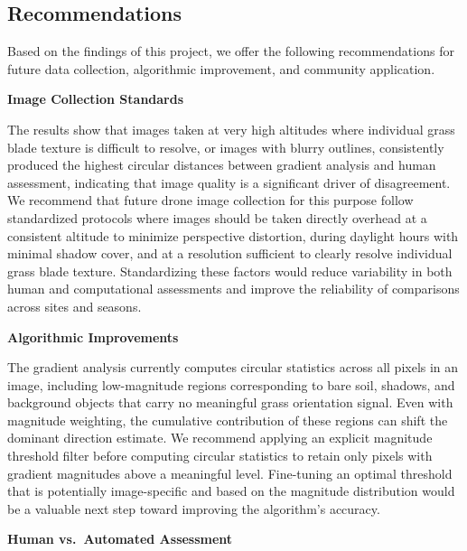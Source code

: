 \documentclass[
]{article}
\begin{document}
\subsection{Recommendations}\label{recommendations}

Based on the findings of this project, we offer the following
recommendations for future data collection, algorithmic improvement, and
community application.

\textbf{Image Collection Standards}

The results show that images taken at very high altitudes where
individual grass blade texture is difficult to resolve, or images with
blurry outlines, consistently produced the highest circular distances
between gradient analysis and human assessment, indicating that image
quality is a significant driver of disagreement. We recommend that
future drone image collection for this purpose follow standardized
protocols where images should be taken directly overhead at a consistent
altitude to minimize perspective distortion, during daylight hours with
minimal shadow cover, and at a resolution sufficient to clearly resolve
individual grass blade texture. Standardizing these factors would reduce
variability in both human and computational assessments and improve the
reliability of comparisons across sites and seasons.

\textbf{Algorithmic Improvements}

The gradient analysis currently computes circular statistics across all
pixels in an image, including low-magnitude regions corresponding to
bare soil, shadows, and background objects that carry no meaningful
grass orientation signal. Even with magnitude weighting, the cumulative
contribution of these regions can shift the dominant direction estimate.
We recommend applying an explicit magnitude threshold filter before
computing circular statistics to retain only pixels with gradient
magnitudes above a meaningful level. Fine-tuning an optimal threshold
that is potentially image-specific and based on the magnitude
distribution would be a valuable next step toward improving the
algorithm's accuracy.

\textbf{Human vs.~Automated Assessment}
\end{document}
